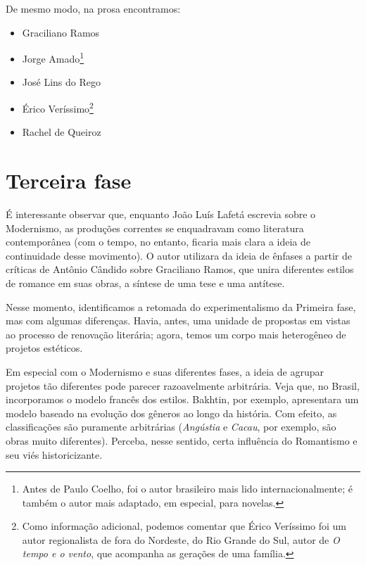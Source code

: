 De mesmo modo, na prosa encontramos:
\begin{itemize}
    \item Graciliano Ramos
    \item Jorge Amado\footnote{Antes de Paulo Coelho, foi o autor brasileiro mais lido internacionalmente; é também o autor mais adaptado, em especial, para novelas.}
    \item José Lins do Rego
    \item Érico Veríssimo\footnote{Como informação adicional, podemos comentar que Érico Veríssimo foi um autor regionalista de fora do Nordeste, do Rio Grande do Sul, autor de \textit{O tempo e o vento}, que acompanha as gerações de uma família.}
    \item Rachel de Queiroz
\end{itemize}

\section{Terceira fase}

É interessante observar que, enquanto João Luís Lafetá escrevia sobre o Modernismo, as produções correntes se enquadravam como literatura contemporânea (com o tempo, no entanto, ficaria mais clara a ideia de continuidade desse movimento). O autor utilizara da ideia de ênfases a partir de críticas de Antônio Cândido sobre Graciliano Ramos, que unira diferentes estilos de romance em suas obras, a síntese de uma tese e uma antítese.

Nesse momento, identificamos a retomada do experimentalismo da Primeira fase, mas com algumas diferenças. Havia, antes, uma unidade de propostas em vistas ao processo de renovação literária; agora, temos um corpo mais heterogêneo de projetos estéticos.

Em especial com o Modernismo e suas diferentes fases, a ideia de agrupar projetos tão diferentes pode parecer razoavelmente arbitrária. Veja que, no Brasil, incorporamos o modelo francês dos estilos. Bakhtin, por exemplo, apresentara um modelo baseado na evolução dos gêneros ao longo da história. Com efeito, as classificações são puramente arbitrárias (\textit{Angústia} e \textit{Cacau}, por exemplo, são obras muito diferentes). Perceba, nesse sentido, certa influência do Romantismo e seu viés historicizante.